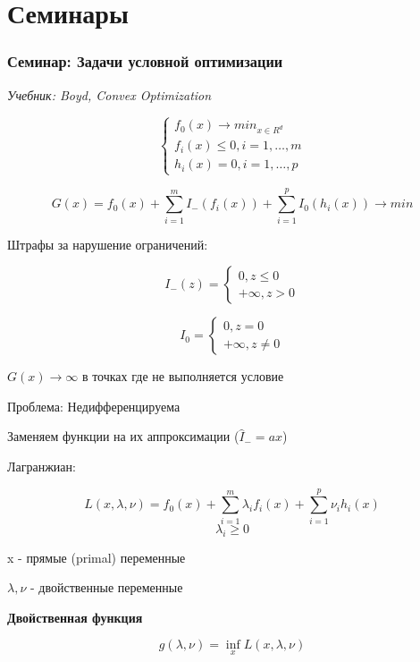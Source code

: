 \documentclass[a4paper, 12pt]{article}
\begin{document}
\part{Семинары}
\section{Семинар: Задачи условной оптимизации}

\textit{Учебник: Boyd, Convex Optimization}

\[\begin{cases}
    f_0(x) \rightarrow min_{x \in R^d} \\
    f_i(x) \leq 0, i = 1, \ldots, m \\
    h_i(x) = 0, i = 1, \ldots, p
\end{cases}\]

\[G(x) = f_0(x) + \sum_{i = 1}^m I_{-}(f_i(x)) + \sum_{i = 1}^p I_0(h_i(x)) \rightarrow min\]

Штрафы за нарушение ограничений:

\[I_{-}(z) = \begin{cases}
    0, z \leq 0 \\
    + \infty, z > 0 
\end{cases}\]

\[I_{0} = \begin{cases}
    0, z = 0 \\
    + \infty, z \neq 0 
\end{cases}\]

\(G(x) \rightarrow \infty\) в точках где не выполняется условие

Проблема: Недифференцируема

Заменяем функции на их аппроксимации ($\hat{I}_{-} = ax$)

Лагранжиан:

\[L(x, \lambda, \nu) = f_0(x) + \sum_{i = 1}^m \lambda_i f_i(x) + \sum_{i = 1}^p \nu_i h_i(x)\]
\[\lambda_i \geq 0\]

x - прямые (primal) переменные

$\lambda, \nu$ - двойственные переменные

\textbf{Двойственная функция}

\[g(\lambda, \nu) = \inf_{x} L(x, \lambda, \nu)\]
\end{document}
